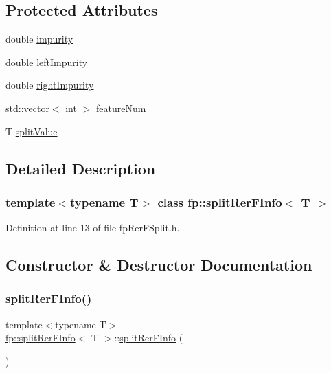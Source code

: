 \subsection*{Protected Attributes}
\begin{DoxyCompactItemize}
\item 
double \hyperlink{classfp_1_1splitRerFInfo_a37516896816870be54ff20a713dc4bd3}{impurity}
\item 
double \hyperlink{classfp_1_1splitRerFInfo_a22a358c2d6a8105bf1af86ed2823d1d1}{left\+Impurity}
\item 
double \hyperlink{classfp_1_1splitRerFInfo_ae9c05e45d6da53a663393e4ff2a01c41}{right\+Impurity}
\item 
std\+::vector$<$ int $>$ \hyperlink{classfp_1_1splitRerFInfo_aad977b73aea39d978ae0f04c3d8bf6ef}{feature\+Num}
\item 
T \hyperlink{classfp_1_1splitRerFInfo_a9bdbbaacd0da790fa938a0f5176890bc}{split\+Value}
\end{DoxyCompactItemize}


\subsection{Detailed Description}
\subsubsection*{template$<$typename T$>$\newline
class fp\+::split\+Rer\+F\+Info$<$ T $>$}



Definition at line 13 of file fp\+Rer\+F\+Split.\+h.



\subsection{Constructor \& Destructor Documentation}
\mbox{\label{classfp_1_1splitRerFInfo_a2071cff382e045b856f29d9fed7f2e8e}} 
\subsubsection{\texorpdfstring{split\+Rer\+F\+Info()}{splitRerFInfo()}}
{\footnotesize\ttfamily template$<$typename T$>$ \\
\hyperlink{classfp_1_1splitRerFInfo}{fp\+::split\+Rer\+F\+Info}$<$ T $>$\+::\hyperlink{classfp_1_1splitRerFInfo}{split\+Rer\+F\+Info} (\begin{DoxyParamCaption}{ }\end{DoxyParamCaption})\hspace{0.3cm}{\ttfamily [inline]}}



